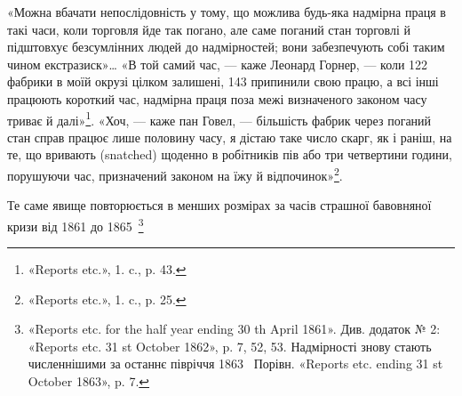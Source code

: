«Можна вбачати непослідовність у тому, що можлива будь-яка
надмірна праця в такі часи, коли торговля йде так погано,
але саме поганий стан торговлі й підштовхує безсумлінних людей
до надмірностей; вони забезпечують собі таким чином екстразиск»\dots{}
«В той самий час, — каже Леонард Горнер, — коли
122 фабрики в моїй окрузі цілком залишені, 143 припинили свою
працю, а всі інші працюють короткий час, надмірна праця поза
межі визначеного законом часу триває й далі»\footnote{
«Reports etc.», 1. c., p. 43.
}. «Хоч, — каже
пан Говел, — більшість фабрик через поганий стан справ працює
лише половину часу, я дістаю таке число скарг, як і раніш, на
те, що вривають (snatched) щоденно в робітників пів або три
четвертини години, порушуючи час, призначений законом на
їжу й відпочинок»\footnote{
«Reports etc.», 1. c., p. 25.
}.

Те саме явище повторюється в менших розмірах за часів страшної
бавовняної кризи від 1861 до 1865~\footnote{
«Reports etc. for the half year ending 30 th April 1861». Див. додаток
№ 2: «Reports etc. 31 st October 1862», p. 7, 52, 53. Надмірності знову
стають численнішими за останнє півріччя 1863~ Порівн. «Reports etc.
ending 31 st October 1863», p. 7.
}

